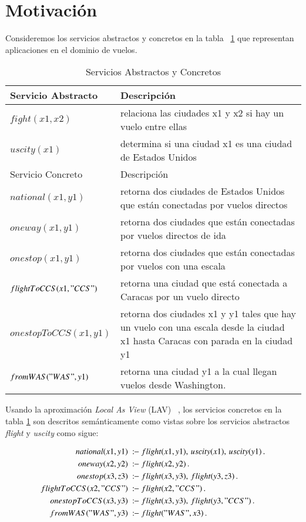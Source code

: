 \documentclass{llncs}
\newcommand{\qrule}{:\!\!-}
\begin{document}
\section{Motivación}

Consideremos los servicios abstractos y concretos en la tabla
~\ref{table:services} que representan aplicaciones en el dominio de vuelos.

\begin{table}
\begin{tabular}{| l| l |}
\hline
Servicio Abstracto & Descripción \\
\hline
$fight(x1,x2)$ & relaciona las ciudades x1 y x2 si hay un vuelo entre ellas\\
\hline
$uscity(x1)$ &  determina si una ciudad x1 es una ciudad de Estados Unidos\\
\hline \hline
Servicio Concreto & Descripción \\
\hline
$national(x1,y1)$&  retorna dos ciudades de Estados Unidos que están conectadas
por vuelos directos \\
\hline
$oneway(x1,y1)$ & retorna dos ciudades que están conectadas por vuelos directos
de ida\\
\hline
$onestop(x1,y1)$ & retorna dos ciudades que están conectadas por vuelos con una
escala\\
\hline
$ flightToCCS(x1,"CCS")$ & retorna una ciudad que está conectada a Caracas por
un vuelo directo\\
 \hline
$ onestopToCCS(x1,y1)$ & retorna dos ciudades x1 y y1 tales que hay un vuelo con
una escala desde la ciudad x1 hasta Caracas con parada en la ciudad y1\\
 \hline
 $fromWAS("WAS",y1)$ &  retorna una ciudad y1 a la cual llegan vuelos desde
Washington.\\
 \hline
\end{tabular}
\label{table:services}
\caption{Servicios Abstractos y Concretos}
\end{table}

Usando la aproximación \emph{Local As View} (LAV) ~\cite{AmbiteISWC09}, los
servicios concretos en la tabla \ref{table:services} son descritos
semánticamente como vistas sobre los servicios abstractos {\it flight} y
{\it uscity} como sigue:   

\begin{alignat*}{1}
national(x1,y1)\ &\qrule\ flight(x1,y1),\,  uscity(x1),\,  uscity(y1)\,. \\
oneway(x2,y2)\ &\qrule\ flight(x2,y2)\,. \\
onestop(x3,z3)\ &\qrule\ flight(x3,y3),\, flight(y3,z3)\,. \\
flightToCCS(x2,"CCS")\ &\qrule\ flight(x2,"CCS")\,. \\
onestopToCCS(x3,y3)\ &\qrule\ flight(x3,y3),\, flight(y3,"CCS")\,. \\
fromWAS("WAS",y3)\ &\qrule\ flight("WAS",x3)\,. \\
\end{alignat*}
\end{document}
